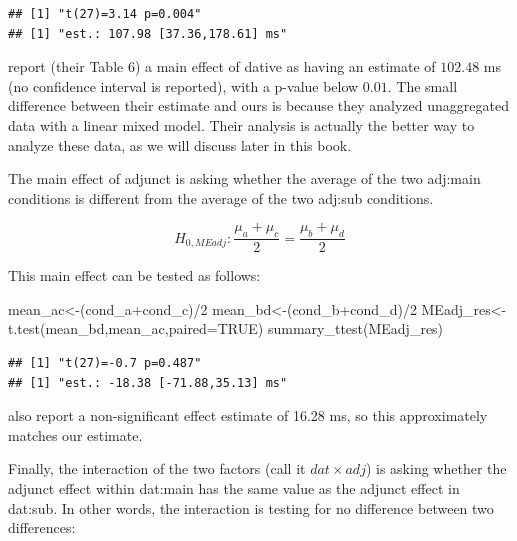 \documentclass[
  12pt,
]{krantz}
\newenvironment{Shaded}{\begin{snugshade}}{\end{snugshade}}
\newcommand{\AttributeTok}[1]{\textcolor[rgb]{0.77,0.63,0.00}{#1}}
\newcommand{\ConstantTok}[1]{\textcolor[rgb]{0.00,0.00,0.00}{#1}}
\newcommand{\DecValTok}[1]{\textcolor[rgb]{0.00,0.00,0.81}{#1}}
\newcommand{\FunctionTok}[1]{\textcolor[rgb]{0.00,0.00,0.00}{#1}}
\newcommand{\NormalTok}[1]{#1}
\newcommand{\OtherTok}[1]{\textcolor[rgb]{0.56,0.35,0.01}{#1}}
\newcommand{\SpecialCharTok}[1]{\textcolor[rgb]{0.00,0.00,0.00}{#1}}
\theoremstyle{definition}
\theoremstyle{definition}
\theoremstyle{definition}
\theoremstyle{definition}
\theoremstyle{remark}
\begin{document}
\begin{verbatim}
## [1] "t(27)=3.14 p=0.004"
## [1] "est.: 107.98 [37.36,178.61] ms"
\end{verbatim}

\citet{levy2013expectation} report (their Table 6) a main effect of dative as having an estimate of \(102.48\) ms (no confidence interval is reported), with a p-value below \(0.01\). The small difference between their estimate and ours is because they analyzed unaggregated data with a linear mixed model. Their analysis is actually the better way to analyze these data, as we will discuss later in this book.

The main effect of adjunct is asking whether the average of the two adj:main conditions is different from the average of the two adj:sub conditions.

\begin{equation}
H_{0,MEadj}: \frac{\mu_a + \mu_c}{2} = \frac{\mu_b + \mu_d}{2}
\end{equation}

This main effect can be tested as follows:

\begin{Shaded}
\begin{Highlighting}[]
\NormalTok{mean\_ac}\OtherTok{\textless{}{-}}\NormalTok{(cond\_a}\SpecialCharTok{+}\NormalTok{cond\_c)}\SpecialCharTok{/}\DecValTok{2}
\NormalTok{mean\_bd}\OtherTok{\textless{}{-}}\NormalTok{(cond\_b}\SpecialCharTok{+}\NormalTok{cond\_d)}\SpecialCharTok{/}\DecValTok{2}
\NormalTok{MEadj\_res}\OtherTok{\textless{}{-}}\FunctionTok{t.test}\NormalTok{(mean\_bd,mean\_ac,}\AttributeTok{paired=}\ConstantTok{TRUE}\NormalTok{)}
\FunctionTok{summary\_ttest}\NormalTok{(MEadj\_res)}
\end{Highlighting}
\end{Shaded}

\begin{verbatim}
## [1] "t(27)=-0.7 p=0.487"
## [1] "est.: -18.38 [-71.88,35.13] ms"
\end{verbatim}

\citet{levy2013expectation} also report a non-significant effect estimate of 16.28 ms, so this approximately matches our estimate.

Finally, the interaction of the two factors (call it \(dat\times adj\)) is asking whether the adjunct effect within dat:main has the same value as the adjunct effect in dat:sub. In other words, the interaction is testing for no difference between two differences:
\end{document}
